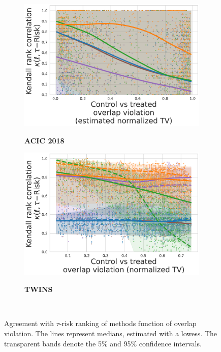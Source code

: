 \documentclass[a4paper,num-refs]{oup-contemporary}%
\begin{document}
\begin{figure}
\begin{subfigure}[b]{0.10\textwidth}
    \end{subfigure}
    \begin{subfigure}[b]{0.44\textwidth}
        \centering
        \caption{\textbf{ACIC 2018}}
        \includegraphics[width=\textwidth]{ktau_acic2018_nuisance_stacking_models_hgb_tset_50.pdf}
        \label{fig:ranking_agreement_w_tau_risk_acic_2018}
    \end{subfigure}
    \hfill
    \begin{subfigure}[b]{0.44\textwidth}
        \centering
        \caption{\textbf{TWINS}}
        \includegraphics[width=\textwidth]{ktau_twins_nuisance_stacking__models_hgb.pdf}
        \label{fig:ranking_agreement_tau_risk_twins}
    \end{subfigure}
    \hfill
    \begin{subfigure}[b]{0.10\textwidth}
        ~
    \end{subfigure}
    \caption{Agreement with $\tau\text{-risk}$ ranking of methods function
        of overlap violation. The lines represent medians, estimated with a
        lowess. The transparent
        bands denote the 5\% and 95\% confidence intervals.}\label{apd:fig:all_datasets_tau_risk_ranking_agreement}
\end{figure}
\end{document}
